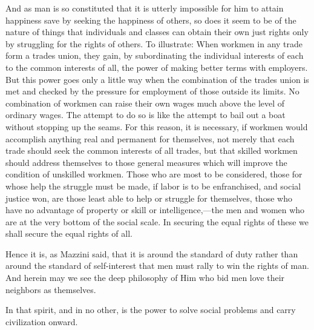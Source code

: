 \documentclass{book}
\begin{document}
And as man is so constituted that it is utterly impossible for him to attain happiness save by seeking the happiness of others, so does it seem to be of the nature of things that individuals and classes can obtain their own just rights only by struggling for the rights of others. To illustrate: When workmen in any trade form a trades union, they gain, by subordinating the individual interests of each to the common interests of all, the power of making better terms with employers. But this power goes only a little way when the combination of the trades union is met and checked by the pressure for employment of those outside its limits. No combination of workmen can raise their own wages much above the level of ordinary wages. The attempt to do so is like the attempt to bail out a boat without stopping up the seams. For this reason, it is necessary, if workmen would accomplish anything real and permanent for themselves, not merely that each trade should seek the common interests of all trades, but that skilled workmen should address themselves to those general measures which will improve the condition of unskilled workmen. Those who are most to be considered, those for whose help the struggle must be made, if labor is to be enfranchised, and social justice won, are those least able to help or struggle for themselves, those who have no advantage of property or skill or intelligence,—the men and women who are at the very bottom of the social scale. In securing the equal rights of these we shall secure the equal rights of all.

Hence it is, as Mazzini said, that it is around the standard of duty rather than around the standard of self-interest that men must rally to win the rights of man. And herein may we see the deep philosophy of Him who bid men love their neighbors as themselves.

In that spirit, and in no other, is the power to solve social problems and carry civilization onward.
\end{document}
